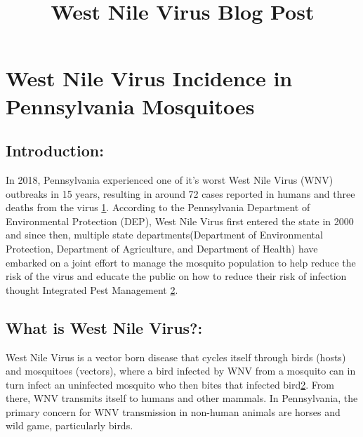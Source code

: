 \documentclass[
  letterpaper,
  DIV=11,
  numbers=noendperiod]{scrartcl}
\title{West Nile Virus Blog Post}
\author{}
\date{}
\begin{document}
\maketitle
\ifdefined\Shaded\renewenvironment{Shaded}{\begin{tcolorbox}[interior hidden, sharp corners, boxrule=0pt, borderline west={3pt}{0pt}{shadecolor}, frame hidden, breakable, enhanced]}{\end{tcolorbox}}\fi

\hypertarget{west-nile-virus-incidence-in-pennsylvania-mosquitoes}{%
\section{West Nile Virus Incidence in Pennsylvania
Mosquitoes}\label{west-nile-virus-incidence-in-pennsylvania-mosquitoes}}

\hypertarget{introduction}{%
\subsection{Introduction:}\label{introduction}}

In 2018, Pennsylvania experienced one of it's worst West Nile Virus
(WNV) outbreaks in 15 years, resulting in around 72 cases reported in
humans and three deaths from the virus
\href{https://www.publicopiniononline.com/story/news/2018/10/09/pennsylvanias-worst-outbreak-west-nile-virus-15-years/1580572002/}{1}.
According to the Pennsylvania Department of Environmental Protection
(DEP), West Nile Virus first entered the state in 2000 and since then,
multiple state departments(Department of Environmental Protection,
Department of Agriculture, and Department of Health) have embarked on a
joint effort to manage the mosquito population to help reduce the risk
of the virus and educate the public on how to reduce their risk of
infection thought Integrated Pest Management
\href{https://www.dep.pa.gov/Business/ProgramIntegration/Vector-Management/Mosquitoes/Pages/default.aspx}{2}.

\hypertarget{what-is-west-nile-virus}{%
\subsection{What is West Nile Virus?:}\label{what-is-west-nile-virus}}

West Nile Virus is a vector born disease that cycles itself through
birds (hosts) and mosquitoes (vectors), where a bird infected by WNV
from a mosquito can in turn infect an uninfected mosquito who then bites
that infected
bird\href{https://www.dep.pa.gov/Business/ProgramIntegration/Vector-Management/Mosquitoes/Pages/default.aspx}{2}.
From there, WNV transmits itself to humans and other mammals. In
Pennsylvania, the primary concern for WNV transmission in non-human
animals are horses and wild game, particularly birds.
\end{document}
